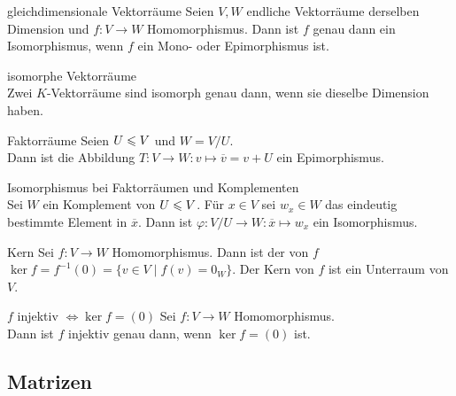 \begin{Satz}{gleichdimensionale Vektorräume}
    Seien $V, W$ endliche Vektorräume derselben Dimension
    und $f: V \rightarrow W$ Homomorphismus.
    Dann ist $f$ genau dann ein Isomorphismus, wenn $f$ ein Mono- oder
    Epimorphismus ist.
\end{Satz}

\begin{Satz}{isomorphe Vektorräume} \\
    Zwei $K$-Vektorräume sind isomorph genau dann, wenn sie dieselbe Dimension
    haben.
\end{Satz}

\begin{Satz}{Faktorräume}
    Seien $U \leqslant V$ und $W = V/U$. \\
    Dann ist die Abbildung $T: V \rightarrow W: v \mapsto \overline{v} = v + U$
    ein Epimorphismus.
\end{Satz}

\begin{Satz}{Isomorphismus bei Faktorräumen und Komplementen} \\
    Sei $W$ ein Komplement von $U \leqslant V$.
    Für $x \in V$ sei $w_x \in W$ das eindeutig bestimmte Element in
    $\overline{x}$.
    Dann ist $\varphi: V/U \rightarrow W: \overline{x} \mapsto w_x$ ein
    Isomorphismus.
\end{Satz}

\begin{Def}{Kern}
    Sei $f: V \rightarrow W$ Homomorphismus.
    Dann ist der  von $f$ \\
    $\ker f = f^{-1}(0) = \{v \in V \;|\; f(v) = 0_W\}$.
    Der Kern von $f$ ist ein Unterraum von $V$.
\end{Def}

\begin{Satz}{$f$ injektiv $\Leftrightarrow \ker f = (0)$}
    Sei $f: V \rightarrow W$ Homomorphismus. \\
    Dann ist $f$ injektiv genau dann, wenn $\ker f = (0)$ ist.
\end{Satz}

\subsection{%
    Matrizen%
}


